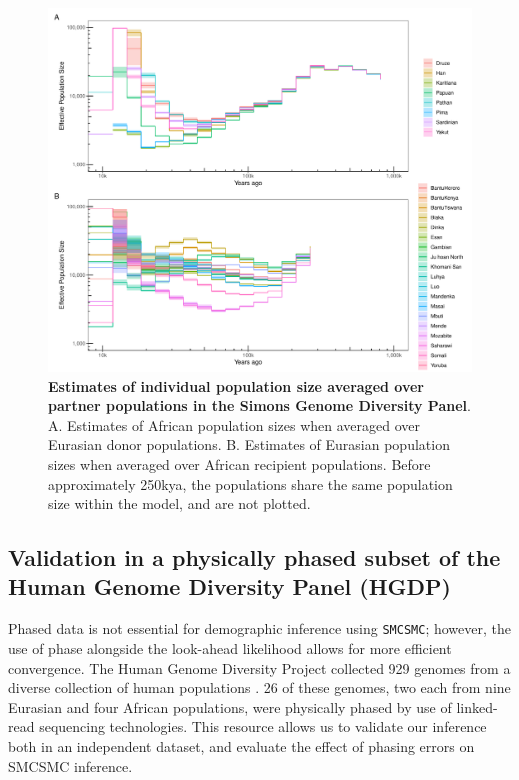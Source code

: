 \documentclass{article}
\begin{document}
\begin{figure}
    \centering
    \includegraphics[width=\textwidth]{plot/individual_populations_averaged.pdf}
    \caption{\textbf{Estimates of individual population size averaged over partner populations in the Simons Genome Diversity Panel}. A. Estimates of African population sizes when averaged over Eurasian donor populations. B. Estimates of Eurasian population sizes when averaged over African recipient populations. Before approximately 250kya, the populations share the same population size within the model, and are not plotted.}
    \label{fig:my_label}
\end{figure}


\subsection{Validation in a physically phased subset of the Human Genome Diversity Panel (HGDP)} \label{hgdp_section}

Phased data is not essential for demographic inference using {\tt SMCSMC}; however, the use of phase alongside the look-ahead likelihood allows for more efficient convergence. The Human Genome Diversity Project collected 929 genomes from a diverse collection of human populations \cite{Bergstrom2019}. 26 of these genomes, two each from nine Eurasian and four African populations, were physically phased by use of linked-read sequencing technologies. This resource allows us to validate our inference both in an independent dataset, and evaluate the effect of phasing errors on SMCSMC inference.   
\end{document}

